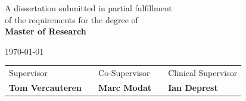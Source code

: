 \documentclass[a4paper,10pt]{book}
\theoremstyle{definition}
\begin{document}
\begin{titlepage}
\vspace{1cm}

\begin{center}
	A dissertation submitted in partial fulfillment 
	\\
	of the requirements for the degree of
	\\ 
	{\bf Master of Research}	
\end{center}

\vspace{0.2cm}
\begin{center}
	\today
\end{center}

\vspace{2.0cm}

\begin{center}
\begin{tabular}{l p{1.5cm} l p{1.5cm} l}
	Supervisor&   & Co-Supervisor & &  Clinical Supervisor \\
	\textbf{Tom Vercauteren} &  & \textbf{Marc Modat}& & \textbf{Ian Deprest}  \\
\end{tabular}
\end{center}

\par
\vfill\par 

\endgroup


\end{titlepage}




 



\pagestyle{plain}  
\tableofcontents



\end{document}
